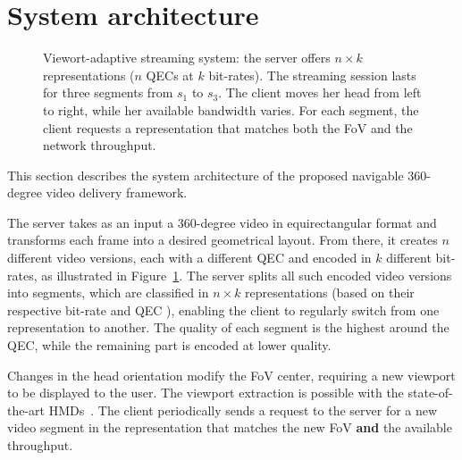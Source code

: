 \section{System architecture}

\begin{figure}
   \centering
   
   \caption{Viewort-adaptive streaming system: the server offers $n\times k$ representations ($n$ \acp{QEC} at $k$ bit-rates). The streaming session lasts for three segments from $s_1$ to $s_3$. The client moves her head from left to right, while her available bandwidth varies. For each segment, the client requests a representation that matches both the \ac{FoV} and the network throughput.}
   \label{fig:newdelivery}
\end{figure}

This section describes the system architecture of the proposed
navigable 360-degree video delivery framework.

 The server takes as an input a 360-degree video in
equirectangular format and transforms each frame into a desired
geometrical layout. From there, it creates $n$ different video
versions, each with a different \ac{QEC} and encoded in $k$ different
bit-rates, as illustrated in Figure~\ref{fig:newdelivery}. The server
splits all such encoded video versions into segments, which are
classified in $n\times{}k$ representations (based on their respective
bit-rate and \ac{QEC} ), enabling the client to regularly switch
from one representation to another. The quality of each segment is the
highest around the \ac{QEC}, while the remaining part is encoded at
lower quality.

  Changes
in the head orientation modify the \ac{FoV} center, requiring a new
viewport to be displayed to the user. The viewport extraction is
possible with the state-of-the-art \acp{HMD}~\cite{fovhmds}. The
client periodically sends a request to the server for a new video
segment in the representation that matches the new \ac{FoV}
\textbf{and} the available throughput.


